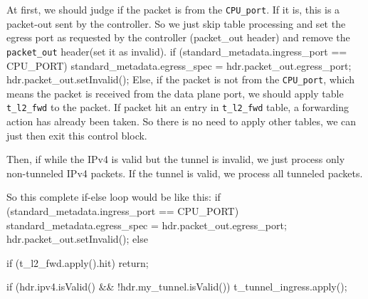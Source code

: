 \documentclass{article}%
\newenvironment{code}%
   {\snugshade\verbatim}%
   {\endverbatim\endsnugshade}
\begin{document}
\begin{Large}
At first, we should judge if the packet is from the \texttt{CPU\_port}. If it is, this is a packet-out sent by the controller. So we just skip table processing and set the egress port as requested by the controller (packet\_out header) and remove the \texttt{packet\_out} header(set it as invalid).
\begin{code}
    if (standard_metadata.ingress_port == CPU_PORT) {
        standard_metadata.egress_spec = hdr.packet_out.egress_port;
        hdr.packet_out.setInvalid();
    }
\end{code}
\newpage
Else, if the packet is not from the \texttt{CPU\_port}, which means the packet is received from the data plane port, we should apply table \texttt{t\_l2\_fwd} to the packet. If packet hit an entry in \texttt{t\_l2\_fwd} table, a forwarding action has already been taken. So there is no need to apply other tables, we can just then exit this control block.

Then, if while the IPv4 is valid but the tunnel is invalid, we just process only non-tunneled IPv4 packets. If the tunnel is valid, we process all tunneled packets.

So this complete if-else loop would be like this:
\begin{code}
    if (standard_metadata.ingress_port == CPU_PORT) {
        standard_metadata.egress_spec = hdr.packet_out.egress_port;
        hdr.packet_out.setInvalid();
    } else {
        if (t_l2_fwd.apply().hit) {
            return;
        }

        if (hdr.ipv4.isValid() && !hdr.my_tunnel.isValid()) {
            t_tunnel_ingress.apply();
        }

}
\end{code}
\end{Large}
\end{document}
